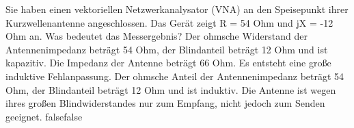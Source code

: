     {Sie haben einen vektoriellen Netzwerkanalysator (VNA) an den Speisepunkt ihrer Kurzwellenantenne angeschlossen. Das Gerät zeigt R = 54 Ohm und jX = -12 Ohm an. Was bedeutet das Messergebnis?}
    {Der ohmsche Widerstand der Antennenimpedanz beträgt 54 Ohm, der Blindanteil beträgt 12 Ohm und ist kapazitiv.}
    {Die Impedanz der Antenne beträgt 66 Ohm. Es entsteht eine große induktive Fehlanpassung.}
    {Der ohmsche Anteil der Antennenimpedanz beträgt 54 Ohm, der Blindanteil beträgt 12 Ohm und ist induktiv.}
    {Die Antenne ist wegen ihres großen Blindwiderstandes nur zum Empfang, nicht jedoch zum Senden geeignet.}
    {false}{false}